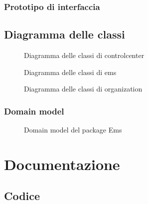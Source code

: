 \documentclass{article}
\begin{document}
    \subsubsection{Prototipo di interfaccia}
    \subsection{Diagramma delle classi}

    \begin{figure}
        \centering
        
        \caption{Diagramma delle classi di controlcenter}
        \label{fig:uml-controlcenter}
    \end{figure}

    \begin{figure}
        \centering
        
        \caption{Diagramma delle classi di ems}
        \label{fig:uml-ems}
    \end{figure}

    \begin{figure}
        \centering
        
        \caption{Diagramma delle classi di organization}
        \label{fig:uml-organization}
    \end{figure}

    \subsubsection{Domain model}
    \begin{figure}
        \centering
        
        \caption{Domain model del package Ems}
        \label{fig:uml-ems-domainmodel}
    \end{figure}

    \section{Documentazione}
    \subsection{Codice}
\end{document}
